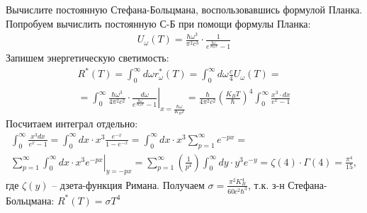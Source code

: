 \documentclass[__main__.tex]{subfiles}
\begin{document}
Вычислите постоянную Стефана-Больцмана, воспользовавшись формулой Планка.\\


Попробуем вычислить постоянную С-Б при помощи формулы Планка:
\begin{gather*}
    U_\omega(T)=\frac{\hbar\omega^3}{\pi^2c^3}\cdot\frac{1}{e^{\frac{\hbar\omega}{K_BT}}-1}
\end{gather*}
Запишем энергетическую светимость:
\begin{gather*}
    R^\ast(T)
    =
    \int_{0}^{\infty}d\omega r^\ast_\omega(T)
    =
    \int_{0}^{\infty}d\omega\frac{c}{4}U_\omega(T)
    =\\
    =
    \left.
    \int_{0}^{\infty}\frac{\hbar\omega^3}{4\pi^2c^2}\cdot\frac{d\omega}{e^{\frac{\hbar\omega}{K_BT}}-1}
    \right|_{x=\frac{\hbar\omega}{K_BT}}
    =
    \frac{\hbar}{4\pi^2c^2}\left(\frac{K_BT}{\hbar}\right)^4\int_{0}^{\infty}\frac{x^3\cdot dx}{e^x-1}
\end{gather*}
Посчитаем интеграл отдельно:
\begin{gather*}
    \int_{0}^{\infty}\frac{x^3dx}{e^x-1}
    =
    \int_{0}^{\infty}dx\cdot x^3\frac{e^{-x}}{1-e^{-x}}
    =
    \int_{0}^{\infty}dx\cdot x^3\sum_{p=1}^{\infty}e^{-px}
    =\\
    \left.
    \sum_{p=1}^{\infty}\int_{0}^{\infty}dx\cdot x^3e^{-px}
    \right|_{y=-px}
    =
    \sum_{p=1}^{\infty}\left(\frac{1}{p^4}\right)\int_{0}^{\infty}dy\cdot y^3e^{-y}
    =
    \zeta(4)\cdot\Gamma(4)
    =
    \frac{\pi^4}{15},
\end{gather*}
где $\zeta(y)$ -- дзета-функция Римана.
Получаем $\sigma=\frac{\pi^2K_B^4}{60c^2\hbar^3}$, т.к. з-н Стефана-Больцмана: $R^\ast(T)=\sigma T^4$
\end{document}
